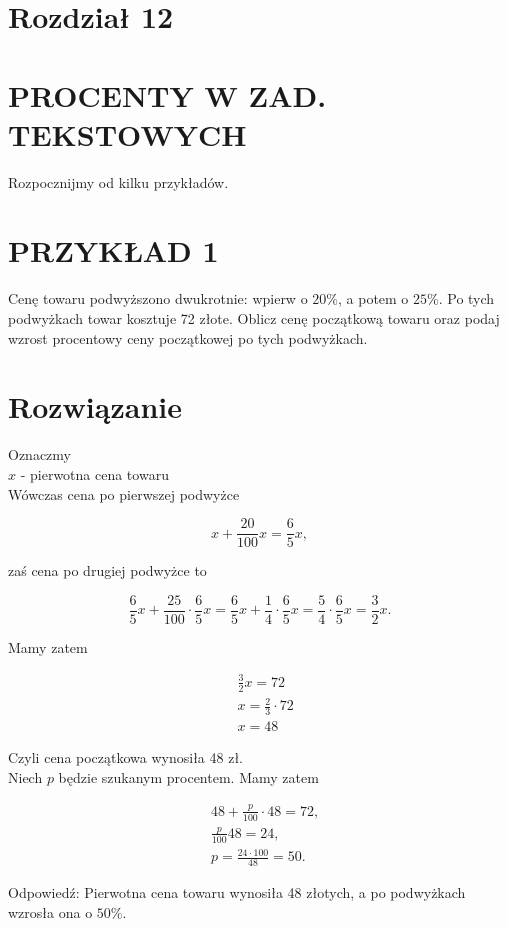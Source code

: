 \documentclass[10pt]{article}
\begin{document}
\section*{Rozdział 12}
\section*{PROCENTY W ZAD. TEKSTOWYCH}
Rozpocznijmy od kilku przykładów.

\section*{PRZYKŁAD 1}
Cenę towaru podwyższono dwukrotnie: wpierw o \(20 \%\), a potem o \(25 \%\). Po tych podwyżkach towar kosztuje 72 złote. Oblicz cenę początkową towaru oraz podaj wzrost procentowy ceny początkowej po tych podwyżkach.

\section*{Rozwiązanie}
Oznaczmy\\
\(x\) - pierwotna cena towaru\\
Wówczas cena po pierwszej podwyżce

\[
x+\frac{20}{100} x=\frac{6}{5} x,
\]

zaś cena po drugiej podwyżce to

\[
\frac{6}{5} x+\frac{25}{100} \cdot \frac{6}{5} x=\frac{6}{5} x+\frac{1}{4} \cdot \frac{6}{5} x=\frac{5}{4} \cdot \frac{6}{5} x=\frac{3}{2} x .
\]

Mamy zatem

\[
\begin{aligned}
& \frac{3}{2} x=72 \\
& x=\frac{2}{3} \cdot 72 \\
& x=48
\end{aligned}
\]

Czyli cena początkowa wynosiła 48 zł.\\
Niech \(p\) będzie szukanym procentem. Mamy zatem

\[
\begin{aligned}
& 48+\frac{p}{100} \cdot 48=72, \\
& \frac{p}{100} 48=24, \\
& p=\frac{24 \cdot 100}{48}=50 .
\end{aligned}
\]

Odpowiedź: Pierwotna cena towaru wynosiła 48 złotych, a po podwyżkach wzrosła ona o \(50 \%\).
\end{document}
